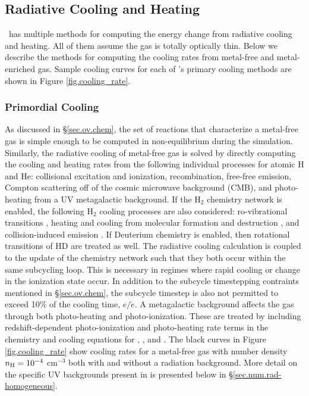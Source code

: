 \subsection{Radiative Cooling and Heating}
\label{sec.num.cooling}

\enzo\ has multiple methods for computing the energy change from
radiative cooling and heating.  All of them assume the gas is totally
optically thin.  Below we describe the methods for computing the
cooling rates from metal-free and metal-enriched gas.  Sample cooling
curves for each of \enzo's primary cooling methods are shown in Figure
\ref{fig.cooling_rate}.

\subsubsection{Primordial Cooling}

As discussed in \S\ref{sec.ov.chem}, the set of reactions that
characterize a metal-free gas is simple enough to be computed in
non-equilibrium during the simulation.  Similarly, the radiative
cooling of metal-free gas is solved by directly computing the cooling
and heating rates from the following individual processes for atomic H
and He: collisional excitation and ionization, recombination,
free-free emission, Compton scattering off of the cosmic microwave
background (CMB), and photo-heating from a UV metagalactic background.
If the H$_{2}$ chemistry network is enabled, the following H$_{2}$
cooling processes are also considered: ro-vibrational transitions
\citep{1998A&A...335..403G}, heating and cooling from molecular
formation and destruction \citep{2009Sci...325..601T}, and
collision-induced emission \citep{2004MNRAS.348.1019R}.  If Deuterium
chemistry is enabled, then rotational transitions of HD
\citep{1998A&A...335..403G} are treated as well.  The radiative
cooling calculation is coupled to the update of the chemistry network
such that they both occur within the same subcycling loop.  This is
necessary in regimes where rapid cooling or change in the ionization
state occur.  In addition to the subcycle timestepping contraints
mentioned in \S\ref{sec.ov.chem}, the subcycle timestep is also not
permitted to exceed 10\% of the cooling time, $e/\dot{e}$.  A
metagalactic background affects the gas through both photo-heating and
photo-ionization.  These are treated by including redshift-dependent
photo-ionization and photo-heating rate terms in the chemistry and
cooling equations for , , and .  The
black curves in Figure \ref{fig.cooling_rate} show cooling rates for a
metal-free gas with number density $n_{\rm H} = 10^{-4}$ cm$^{-3}$ both
with and without a radiation background.  More detail on the specific
UV backgrounds present in \enzo is presented below in
\S\ref{sec.num.rad-homogeneous}.

